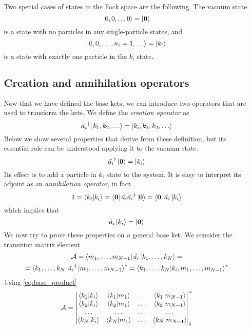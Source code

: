 Two special cases of states in the Fock space are the following. The vacuum state
\begin{equation}
    \ket{0,0,\dots0} = \ket{\mathbf{\boldsymbol{0}}}
\end{equation}
is a state with no particles in any single-particle states, and
\begin{equation}
    \ket{0,0,\dots, n_i = 1, \dots} = \ket{k_i}
\end{equation}
is a state with exactly one particle in the $k_i$ state.

\subsection{Creation and annihilation operators}
Now that we have defined the base kets, we can introduce two operators that are used to transform the kets. We define the \emph{creation operator} as
\begin{equation} \label{eq:creation_definition}
    \hat{a_i}^\dagger \ket{k_1, k_2, \dots} = \ket{k_i,k_1, k_2, \dots}
\end{equation}
Below we show several properties that derive from these definition, but its essential role can be understood applying it to the vacuum state.
\begin{equation}
    \hat{a_i}^\dagger \ket{\mathbf{\boldsymbol{0}}} = \ket{k_i}
\end{equation}
Its effect is to add a particle in $k_i$ state to the system. It is easy to interpret its adjoint as an \emph{annihilation operator}, in fact
\begin{equation}
    1 = \braket{k_i}{k_i} = \bra{\mathbf{\boldsymbol{0}}}\hat{a_i}\hat{a_i}^\dagger\ket{\mathbf{\boldsymbol{0}}} = \bra{\mathbf{\boldsymbol{0}}}\hat{a_i}\ket{k_i}
\end{equation}
which implies that
\begin{equation}
    \hat{a_i}\ket{k_i} = \ket{\mathbf{\boldsymbol{0}}}
\end{equation}
We now try to prove these properties on a general base ket. We consider the transition matrix element
\begin{multline} \label{eq:annihilation_matrix}
    \mathcal{A} =  \bra{m_1, \dots, m_{N-1}} \hat{a_i} \ket{k_1, \dots, k_N} =
    \\ =  \bra{k_1, \dots, k_N} \hat{a_i}^\dagger \ket{m_1, \dots, m_{N-1}}^*
    = \bra{k_1, \dots, k_N} \ket{k_i, m_1, \dots, m_{N-1}}^*
\end{multline}
Using \cref{eq:base_product}
\begin{equation}
    \mathcal{A} = \begin{vmatrix}
        \braket{k_1}{k_i} & \braket{k_1}{m_1} & \dots & \braket{k_1}{m_{N-1} } \\
        \braket{k_2}{k_i} & \braket{k_2}{m_1} & \dots & \braket{k_2}{m_{N-1}}  \\
        \dots             & \dots             & \dots & \dots                  \\
        \braket{k_N}{k_i} & \braket{k_N}{m_1} & \dots & \braket{k_N}{m_{N-1}}  \\
    \end{vmatrix}_\xi^*
\end{equation}
